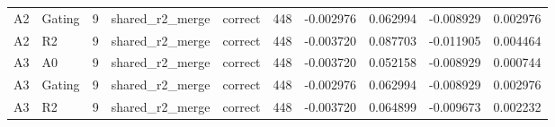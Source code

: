 \begin{tabular}{llrllrrrrr}
A2 & Gating & 9 & shared_r2_merge & correct & 448 & -0.002976 & 0.062994 & -0.008929 & 0.002976 \\
A2 & R2 & 9 & shared_r2_merge & correct & 448 & -0.003720 & 0.087703 & -0.011905 & 0.004464 \\
A3 & A0 & 9 & shared_r2_merge & correct & 448 & -0.003720 & 0.052158 & -0.008929 & 0.000744 \\
A3 & Gating & 9 & shared_r2_merge & correct & 448 & -0.002976 & 0.062994 & -0.008929 & 0.002976 \\
A3 & R2 & 9 & shared_r2_merge & correct & 448 & -0.003720 & 0.064899 & -0.009673 & 0.002232 \\
\bottomrule
\end{tabular}
